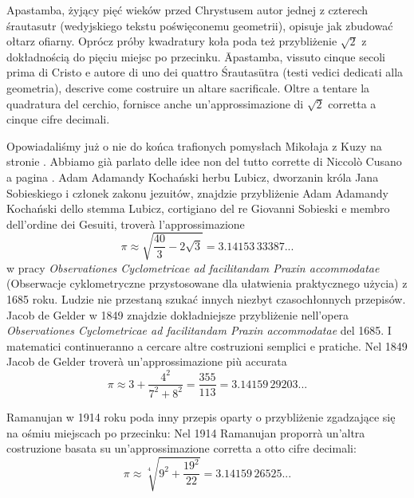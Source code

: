 Apastamba, żyjący pięć wieków przed Chrystusem autor jednej z czterech śrautasutr (wedyjskiego tekstu poświęconemu geometrii), opisuje jak zbudować ołtarz ofiarny. %
Oprócz próby kwadratury koła poda też przybliżenie $\sqrt 2$ z dokładnością do pięciu miejsc po przecinku. %
Āpastamba, vissuto cinque secoli prima di Cristo e autore di uno dei quattro Śrautasūtra (testi vedici dedicati alla geometria), descrive come costruire un altare sacrificale. %
Oltre a tentare la quadratura del cerchio, fornisce anche un'approssimazione di $\sqrt 2$ corretta a cinque cifre decimali. %

Opowiadaliśmy już o nie do końca trafionych pomysłach Mikołaja z Kuzy na stronie \pageref{nierownosc_mikolaja_z_kuzy}. %
Abbiamo già parlato delle idee non del tutto corrette di Niccolò Cusano a pagina \pageref{nierownosc_mikolaja_z_kuzy}. %
Adam Adamandy Kochański herbu Lubicz, dworzanin króla Jana Sobieskiego i członek zakonu jezuitów, znajdzie przybliżenie %
Adam Adamandy Kochański dello stemma Lubicz, cortigiano del re Giovanni Sobieski e membro dell'ordine dei Gesuiti, troverà l'approssimazione %
%
\begin{equation}
    \pi \approx \sqrt{\frac{40}{3} - 2 \sqrt{3}} = 3.14153\,33387...
\end{equation}
w pracy \emph{Observationes Cyclometricae ad facilitandam Praxin accommodatae} (Obserwacje cyklometryczne przystosowane dla ułatwienia praktycznego użycia) z 1685 roku. %
Ludzie nie przestaną szukać innych niezbyt czasochłonnych przepisów. %
Jacob de Gelder w 1849 znajdzie dokładniejsze przybliżenie %
nell'opera \emph{Observationes Cyclometricae ad facilitandam Praxin accommodatae} del 1685. %
I matematici continueranno a cercare altre costruzioni semplici e pratiche. %
Nel 1849 Jacob de Gelder troverà un'approssimazione più accurata %
%
\begin{equation}
    \pi \approx 3 + \frac{4^2}{7^2 + 8^2} = \frac{355}{113} = 3.14159\,29203...
\end{equation}

Ramanujan w 1914 roku poda inny przepis oparty o przybliżenie zgadzające się na ośmiu miejscach po przecinku: %
Nel 1914 Ramanujan proporrà un'altra costruzione basata su un'approssimazione corretta a otto cifre decimali: %
%
\begin{equation}
    \pi \approx \sqrt[4]{9^2 + \frac{19^2}{22}} = 3.14159\,26525...
\end{equation}

